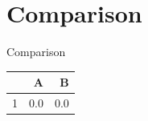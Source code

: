 \section{Comparison}
\begin{frame}{Comparison}
  \begin{table}
    \centering
    \begin{tabular}{lrr}
      \toprule
       & A & B \\
      \midrule
      1 & 0.0 & 0.0 \\
      \bottomrule
    \end{tabular}
  \end{table}
\end{frame}
